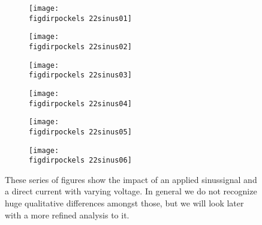 \begin{figure}
    \begin{subfigure}[b]{\picwidth}
        \texttt{[image: \\figdirpockels 22sinus01]}
        \caption{}
    \end{subfigure}\qquad
    \begin{subfigure}[b]{\picwidth}
        \texttt{[image: \\figdirpockels 22sinus02]}
        \caption{}
    \end{subfigure}
    \begin{subfigure}[b]{\picwidth}
        \texttt{[image: \\figdirpockels 22sinus03]}
        \caption{}
    \end{subfigure}
    \begin{subfigure}[b]{\picwidth}
        \texttt{[image: \\figdirpockels 22sinus04]}
        \caption{}
    \end{subfigure}
    \begin{subfigure}[b]{\picwidth}
        \texttt{[image: \\figdirpockels 22sinus05]}
        \caption{}
    \end{subfigure}
    \begin{subfigure}[b]{\picwidth}
        \texttt{[image: \\figdirpockels 22sinus06]}
        \caption{}
    \end{subfigure}

    \caption{These series of figures show the impact of
        an applied sinussignal and a direct current with
        varying voltage. In general we do not recognize huge 
        qualitative differences amongst those, but we will look
        later with a more refined analysis to it.}
    \label{fig:sinus1}
\end{figure}
\flushleft
